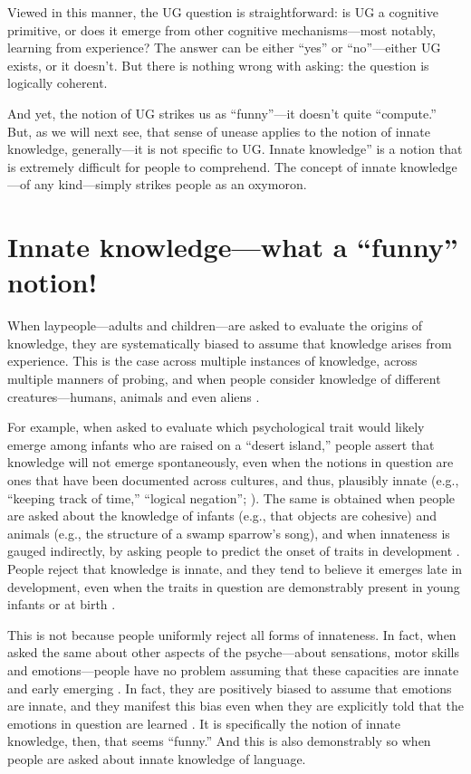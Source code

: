 \documentclass[output=paper,colorlinks,citecolor=brown
]{langscibook}
\begin{document}
Viewed in this manner, the UG question is straightforward: is UG a cognitive primitive, or does it emerge from other cognitive mechanisms—most notably, learning from experience?
The answer can be either “yes” or “no”—either UG exists, or it doesn’t. But there is nothing wrong with asking: the question is logically coherent. 

And yet, the notion of UG strikes us as “funny”—it doesn’t quite “compute.” But, as we will next see, that sense of unease applies to the notion of innate knowledge, generally—it is not specific to UG.  Innate knowledge” is a notion that is extremely difficult for people to comprehend. The concept of innate knowledge—of any kind—simply strikes people as an oxymoron.

\section{Innate knowledge—what a “funny” notion!}

When laypeople—adults and children—are asked to evaluate the origins of knowledge, they are systematically biased to assume that knowledge arises from experience. This is the case across multiple instances of knowledge, across multiple manners of probing, and when people consider knowledge of different creatures—humans, animals and even aliens \citep{berent2019people,wang2019empiricism}.

For example, when asked to evaluate which psychological trait would likely emerge among infants who are raised on a “desert island,” people assert that knowledge will not emerge spontaneously, even when the notions in question are ones that have been documented across cultures, and thus, plausibly innate (e.g., “keeping track of time,” “logical negation”; \cite{berent2019people}). The same is obtained when people are asked about the knowledge of infants (e.g., that objects are cohesive) and animals (e.g., the structure of a swamp sparrow’s song), and when innateness is gauged indirectly, by asking people to predict the onset of traits in development \citep{berent2019people}. People reject that knowledge is innate, and they tend to believe it emerges late in development, even when the traits in question are demonstrably present in young infants or at birth \citep{wang2019empiricism}.

This is not because people uniformly reject all forms of innateness. In fact, when asked the same about other aspects of the psyche—about sensations, motor skills and emotions—people have no problem assuming that these capacities are innate and early emerging \citep{berent2019people}. In fact, they are positively biased to assume that emotions are innate, and they manifest this bias even when they are explicitly told that the emotions in question are learned \citep{berent2020essentialist}. It is specifically the notion of innate knowledge, then, that seems “funny.” And this is also demonstrably so when people are asked about innate knowledge of language.
\end{document}
